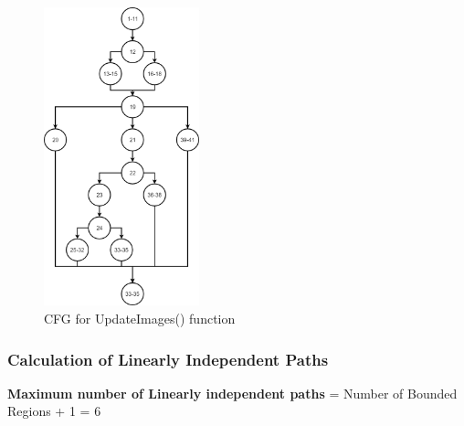 \documentclass{scrreprt}
\begin{document}
\begin{figure}[H]
\centering
\includegraphics[width=0.4\textwidth, keepaspectratio]{updateImages.png}
\caption{CFG for UpdateImages() function}
\end{figure}


\subsubsection{Calculation of Linearly Independent Paths}
\textbf{Maximum number of Linearly independent paths} = Number of Bounded Regions + 1 = 6
\end{document}
